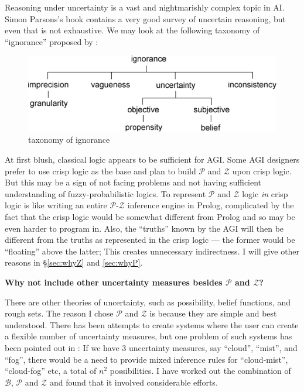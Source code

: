 Reasoning under uncertainty is a vast and nightmarishly complex topic in AI.  Simon Parsons's book \citep*{Parsons2001} contains a very good survey of uncertain reasoning, but even that is not exhaustive.  We may look at the following taxonomy of ``ignorance'' proposed by \citep*{Bosc1997}:
\begin{figure}[H]
\centering
\includegraphics[scale=0.7]{IgnoranceTaxonomy.png}
\caption{taxonomy of ignorance}
\end{figure}

At first blush, classical logic appears to be sufficient for AGI.  Some AGI designers prefer to use crisp logic as the base and plan to build $\mathcal{P}$ and $\mathcal{Z}$ upon crisp logic.  But this may be a sign of not facing problems and not having sufficient understanding of fuzzy-probabilistic logics.  To represent $\mathcal{P}$ and $\mathcal{Z}$ logic \textit{in} crisp logic is like writing an entire $\mathcal{P}$-$\mathcal{Z}$ inference engine in Prolog, complicated by the fact that the crisp logic would be somewhat different from Prolog and so may be even harder to program in.  Also, the ``truths'' known by the AGI will then be different from the truths as represented in the crisp logic --- the former would be ``floating'' above the latter;  This creates unnecessary indirectness.  I will give other reasons in \S\ref{sec:whyZ} and \ref{sec:whyP}.

\textbf{Why not include other uncertainty measures besides $\mathcal{P}$ and $\mathcal{Z}$?}

There are other theories of uncertainty, such as possibility, belief functions, and rough sets.  The reason I chose $\mathcal{P}$ and $\mathcal{Z}$ is because they are simple and best understood.  There has been attempts to create systems where the user can create a flexible number of uncertainty measures, but one problem of such systems has been pointed out in \citep*{Parsons2001}:  If we have 3 uncertainty measures, say ``cloud'', ``mist'', and ``fog'', there would be a need to provide mixed inference rules for ``cloud-mist'', ``cloud-fog'' etc, a total of $n^2$ possibilities.  I have worked out the combination of $\mathcal{B}$, $\mathcal{P}$ and $\mathcal{Z}$ and found that it involved considerable efforts.

